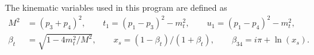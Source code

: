 \documentclass[letterpaper,aps,prd,,nofootinbib]{revtex4}
\begin{document}
The kinematic variables used in this program are defined as
\begin{align}
      M^2&=(p_3+p_4)^2,
       \qquad t_1=(p_1-p_3)^2-m_t^2,
       \qquad u_1 = (p_1-p_4)^2-m_t^2, \nonumber \\
       \beta_t&=\sqrt{1-4m_t^2/M^2}, \qquad x_s=(1-\beta_t)/(1+\beta_t), \qquad \beta_{34}=i\pi+\ln(x_s).
\end{align}


\begin{thebibliography}{199}

\end{thebibliography}
\end{document}

